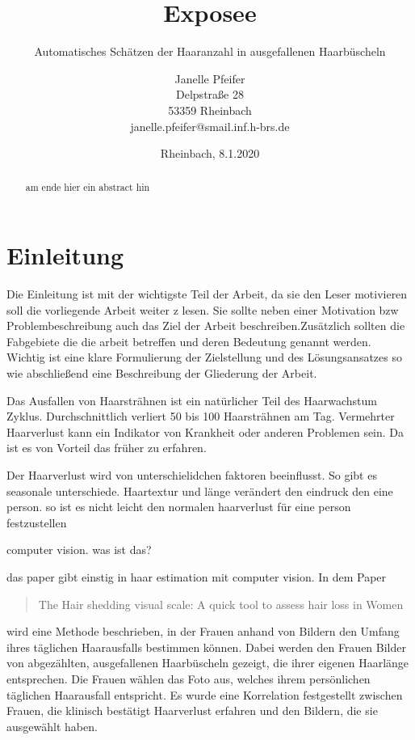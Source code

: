 \documentclass[german,a4paper,12pt]{llncs}
\title{Exposee}
\subtitle{Automatisches Schätzen der Haaranzahl in ausgefallenen Haarbüscheln}
\author{\parbox{.9\textwidth}{\centering 
		\large Janelle Pfeifer \\
		\small Delpstraße 28\\
		53359 Rheinbach \\
		janelle.pfeifer@smail.inf.h-brs.de}}
\institute{\parbox{.9\textwidth}{\centering 
		\large Hochschule Bonn-Rhein-Sieg \\
		\normalsize Institute of Visual Computing \\ 
		\small Fachbereich Informatik \\
		Studiengang: Informatik (B.SC.)\\
		\normalsize Rheinbach, 15.02.2020}}
\date{Rheinbach, 8.1.2020}
\begin{document}
	\maketitle
	\newpage
	\tableofcontents
	\newpage

\begin{abstract}
	am ende hier ein abstract hin
\end{abstract}

\section{Einleitung}
Die Einleitung ist mit der wichtigste Teil der Arbeit, da sie den Leser motivieren soll die vorliegende Arbeit weiter z lesen. Sie sollte neben einer Motivation bzw Problembeschreibung auch das Ziel der Arbeit beschreiben.Zusätzlich sollten die Fabgebiete die die arbeit betreffen und deren Bedeutung genannt werden. Wichtig ist eine klare Formulierung der Zielstellung und des Lösungsansatzes so wie abschließend eine Beschreibung der Gliederung der Arbeit.

Das Ausfallen von Haarsträhnen ist ein natürlicher Teil des Haarwachstum Zyklus. Durchschnittlich verliert 50 bis 100 Haarsträhnen am Tag. Vermehrter Haarverlust kann ein Indikator von Krankheit oder anderen Problemen sein. Da ist es von Vorteil das früher zu erfahren.

Der Haarverlust wird von unterschielidchen faktoren beeinflusst. So gibt es seasonale unterschiede. Haartextur und länge verändert den eindruck den eine person. so ist es nicht leicht den normalen haarverlust für eine person festzustellen 

computer vision. was ist das?

das paper gibt einstig in haar estimation mit computer vision. In dem Paper \blockquote{The Hair shedding visual scale: A quick tool to assess hair loss in Women} wird eine Methode beschrieben, in der Frauen anhand von Bildern den Umfang ihres täglichen Haarausfalls bestimmen können. Dabei werden den Frauen Bilder von abgezählten, ausgefallenen Haarbüscheln gezeigt, die ihrer eigenen Haarlänge entsprechen. Die Frauen wählen das Foto aus, welches ihrem persönlichen täglichen Haarausfall entspricht. Es wurde eine Korrelation festgestellt zwischen Frauen, die klinisch bestätigt Haarverlust erfahren und den Bildern, die sie ausgewählt haben.\cite{visualScale}
\end{document}
